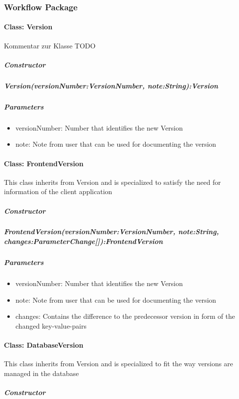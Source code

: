 \subsubsection{Workflow Package}

\paragraph{Class: Version}
Kommentar zur Klasse TODO
\subparagraph{Constructor}

\subparagraph{Version(versionNumber:VersionNumber, note:String):Version}

\subparagraph{Parameters}
\begin{itemize}
	\item{versionNumber:}
	Number that identifies the new Version
	\item{note:}
	Note from user that can be used for documenting the version
\end{itemize}

\paragraph{Class: FrontendVersion}
This class inherits from Version and is specialized to satisfy the need for information of the client application
\subparagraph{Constructor}

\subparagraph{FrontendVersion(versionNumber:VersionNumber, note:String, changes:ParameterChange[]):FrontendVersion}

\subparagraph{Parameters}
\begin{itemize}
	\item{versionNumber:}
	Number that identifies the new Version
	\item{note:}
	Note from user that can be used for documenting the version
	\item{changes:}
	Contains the difference to the predecessor version in form of the changed key-value-pairs
\end{itemize}

\paragraph{Class: DatabaseVersion}
This class inherits from Version and is specialized to fit the way versions are managed in the database
\subparagraph{Constructor}

